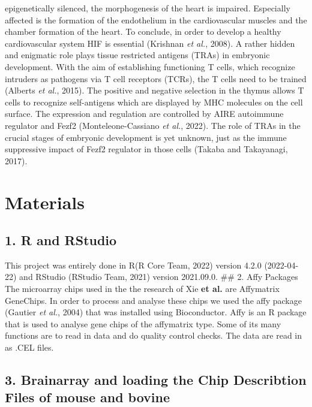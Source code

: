 \documentclass[
  parskip,
  oneside]{scrreprt}
\begin{document}
epigenetically silenced, the morphogenesis of the heart is impaired.
Especially affected is the formation of the endothelium in the
cardiovascular muscles and the chamber formation of the heart. To
conclude, in order to develop a healthy cardiovascular system HIF is
essential (Krishnan \emph{et al.}, 2008). A rather hidden and enigmatic
role plays tissue restricted antigens (TRAs) in embryonic development.
With the aim of establishing functioning T cells, which recognize
intruders as pathogens via T cell receptors (TCRs), the T cells need to
be trained (Alberts \emph{et al.}, 2015). The positive and negative
selection in the thymus allows T cells to recognize self-antigens which
are displayed by MHC molecules on the cell surface. The expression and
regulation are controlled by AIRE autoimmune regulator and Fezf2
(Monteleone-Cassiano \emph{et al.}, 2022). The role of TRAs in the
crucial stages of embryonic development is yet unknown, just as the
immune suppressive impact of Fezf2 regulator in those cells (Takaba and
Takayanagi, 2017).

\hypertarget{materials}{%
\chapter{Materials}\label{materials}}

\hypertarget{r-and-rstudio}{%
\section{1. R and RStudio}\label{r-and-rstudio}}

This project was entirely done in R(R Core Team, 2022) version 4.2.0
(2022-04-22) and RStudio (RStudio Team, 2021) version 2021.09.0. \#\# 2.
Affy Packages The microarray chips used in the the research of Xie
\textbf{et al.} are Affymatrix GeneChips. In order to process and
analyse these chips we used the affy package (Gautier \emph{et al.},
2004) that was installed using Bioconductor. Affy is an R package that
is used to analyse gene chips of the affymatrix type. Some of its many
functions are to read in data and do quality control checks. The data
are read in as .CEL files.

\hypertarget{brainarray-and-loading-the-chip-describtion-files-of-mouse-and-bovine}{%
\section{3. Brainarray and loading the Chip Describtion Files of mouse
and
bovine}\label{brainarray-and-loading-the-chip-describtion-files-of-mouse-and-bovine}}
\end{document}

